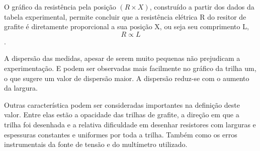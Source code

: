 O gráfico da resistência pela posição $(R\times X)$, construído a partir dos dados
da tabela experimental, permite concluir que a resistência elétrica R do resitor de grafite é diretamente proporcional a sua posição X, ou seja seu comprimento L, $$R \propto L$$.

A dispersão das medidas, apesar de serem muito pequenas não prejudicam a experimentação.
 E podem ser observadas mais facilmente no gráfico da trilha um, o que sugere um valor de dispersão maior. A dispersão reduz-se com o aumento da largura.
 
Outras característica podem ser consideradas importantes na definição deste valor. Entre elas estão a opacidade das trilhas de grafite, a direção em que a trilha foi desenhada e a relativa dificuldade em desenhar resistores com larguras e espessuras constantes e uniformes por toda a trilha. Também como os erros instrumentais da fonte de tensão e do multímetro utilizado. 

